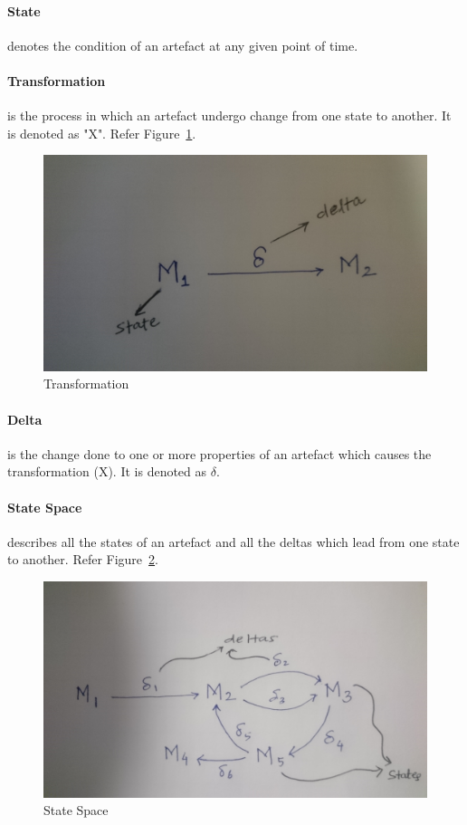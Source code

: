 \paragraph{State} denotes the condition of an artefact at any given point of time.
\paragraph{Transformation} is the process in which an artefact undergo change from one state to another. It is denoted as "X". Refer Figure~\ref{fig:Transformation_Diagram}.
\begin{figure}
	\includegraphics[width=1\textwidth]{figures/Transformation}
	\caption{Transformation}
	\label{fig:Transformation_Diagram}
\end{figure}
\paragraph{Delta} is the change done to one or more properties of an artefact which causes the transformation (X). It is denoted as $\delta$.
\paragraph{State Space} describes all the states of an artefact and all the deltas which lead from one state to another. Refer Figure~\ref{fig:StateSpace_Diagram}.
\begin{figure}
	\includegraphics[width=1\textwidth]{figures/State_Space}
	\caption{State Space}
	\label{fig:StateSpace_Diagram}
\end{figure}
